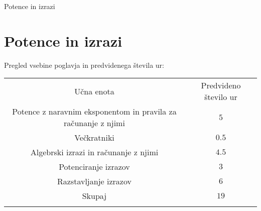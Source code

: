 \begin{priprava}{0}{}{}{Potence in izrazi}{}{}
    
    \chapter{Potence in izrazi}

    \Large{Pregled vsebine poglavja in predvidenega števila ur:}

    \begin{table}[H]
        \centering
        \begin{tabular}{||c|c||} 
        \hhline{|t:==:t|}
        \rowcolor[rgb]{0.843,0.718,0.718} 
        Učna enota  & Predvideno število ur   \\ 
        \hhline{|:==:|}
        Potence z naravnim eksponentom in pravila za računanje z njimi & $5$    \\ 
        \hline
        Večkratniki & $0.5$    \\ 
        \hline
        Algebrski izrazi in računanje z njimi & $4.5$    \\ 
        \hline
        Potenciranje izrazov & $3$     \\
        \hline
        Razstavljanje izrazov & $6$     \\
        \hhline{|:==:|}
        Skupaj & $19$     \\
        \hhline{|b:==:b|}
        \end{tabular}
    \end{table}


    
\end{priprava}